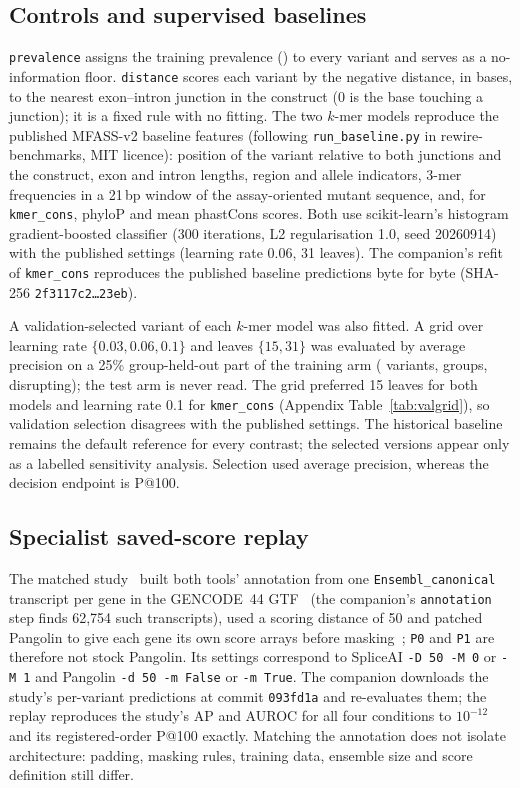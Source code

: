 \documentclass[11pt]{article}
\makeatletter
\newcommand{\cfg}[1]{\texttt{#1}}
\newcommand{\pk}[1]{P@#1}
\makeatother
\begin{document}
\subsection{Controls and supervised baselines}\label{sec:controls}
\cfg{prevalence} assigns the training prevalence (\PrevalenceTrain) to every variant and serves as a no-information
floor. \cfg{distance} scores each variant by the negative distance, in bases, to the nearest exon--intron
junction in the construct (0 is the base touching a junction); it is a fixed rule with no fitting.
The two $k$-mer models reproduce the published MFASS-v2 baseline features (following \texttt{run\_baseline.py}
in rewire-benchmarks, MIT licence): position of the variant relative to both junctions and the construct,
exon and intron lengths, region and allele indicators, 3-mer frequencies in a 21\,bp window of the
assay-oriented mutant sequence, and, for \cfg{kmer\_cons}, phyloP and mean phastCons scores. Both use
scikit-learn's histogram gradient-boosted classifier (300 iterations, L2 regularisation 1.0, seed 20260914)
with the published settings (learning rate 0.06, 31 leaves). The companion's refit of \cfg{kmer\_cons}
reproduces the published baseline predictions byte for byte (SHA-256
\texttt{2f3117c2\ldots23eb}).

A validation-selected variant of each $k$-mer model was also fitted. A grid over learning rate
$\{0.03, 0.06, 0.1\}$ and leaves $\{15, 31\}$ was evaluated by average precision on a 25\% group-held-out part
of the training arm (\ValVariants{} variants, \ValGroups{} groups, \ValPositives{} disrupting); the test arm is
never read. The grid preferred 15 leaves for both models and learning rate 0.1 for \cfg{kmer\_cons}
(Appendix Table~\ref{tab:valgrid}), so validation selection disagrees with the published settings. The
historical baseline remains the default reference for every contrast; the selected versions appear only as a
labelled sensitivity analysis. Selection used average precision, whereas the decision endpoint is \pk{100}.

\subsection{Specialist saved-score replay}\label{sec:replay}
The matched study~\citep{rb_matched_readme,rb_matched_report,rb_matched_manifest} built both tools' annotation
from one \texttt{Ensembl\_canonical} transcript per gene in the GENCODE~44 GTF~\citep{gencode44} (the companion's
\texttt{annotation} step finds 62,754 such transcripts), used a scoring distance of 50 and patched Pangolin to
give each gene its own score arrays before masking~\citep{pangolin_issue29}; \cfg{P0} and \cfg{P1} are therefore
not stock Pangolin. Its settings correspond to SpliceAI \texttt{-D 50 -M 0} or \texttt{-M 1} and Pangolin
\texttt{-d 50 -m False} or \texttt{-m True}. The companion downloads the study's per-variant predictions at
commit \texttt{093fd1a} and re-evaluates them; the replay reproduces the study's AP and AUROC for all four
conditions to $10^{-12}$ and its registered-order \pk{100} exactly. Matching the annotation does not isolate
architecture: padding, masking rules, training data, ensemble size and score definition still differ.
\end{document}
